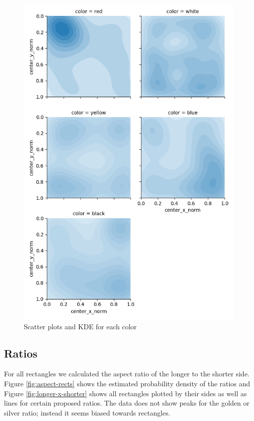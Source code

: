 \begin{figure}
\includegraphics[width=\linewidth]{images/kernel-densities.png}
\caption{Scatter plots and KDE for each color}
\label{fig:kde}
\end{figure}

\subsection{Ratios} \label{ratios}

For all rectangles we calculated the aspect ratio of the longer to the shorter
side. Figure \ref{fig:aspect-rects} shows the estimated probability density of the
ratios and Figure \ref{fig:longer-x-shorter} shows all rectangles plotted by their
sides as well as lines for certain proposed ratios. The data does not show peaks
for the golden or silver ratio; instead it seems biased towards rectangles.

